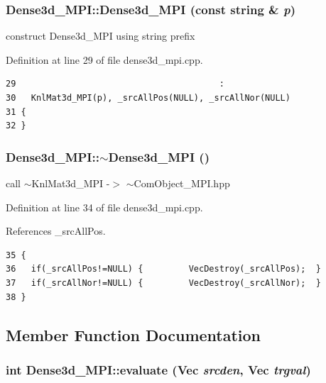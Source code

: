 \subsubsection{\setlength{\rightskip}{0pt plus 5cm}Dense3d\_\-MPI::Dense3d\_\-MPI (const string \& {\em p})}\label{classDense3d__MPI_59f5eb1835ca9679e901a3ed7e570e99_59f5eb1835ca9679e901a3ed7e570e99}


construct Dense3d\_\-MPI using string prefix 

Definition at line 29 of file dense3d\_\-mpi.cpp.

\footnotesize\begin{verbatim}29                                        : 
30   KnlMat3d_MPI(p), _srcAllPos(NULL), _srcAllNor(NULL)
31 {
32 }
\end{verbatim}\normalsize 


\subsubsection{\setlength{\rightskip}{0pt plus 5cm}Dense3d\_\-MPI::$\sim$Dense3d\_\-MPI ()}\label{classDense3d__MPI_465a68462d0c24f1003e280546467196_465a68462d0c24f1003e280546467196}


call $\sim$Knl\-Mat3d\_\-MPI -$>$ $\sim$Com\-Object\_\-MPI.hpp 

Definition at line 34 of file dense3d\_\-mpi.cpp.

References \_\-src\-All\-Pos.

\footnotesize\begin{verbatim}35 {
36   if(_srcAllPos!=NULL) {         VecDestroy(_srcAllPos);  }
37   if(_srcAllNor!=NULL) {         VecDestroy(_srcAllNor);  }
38 }
\end{verbatim}\normalsize 




\subsection{Member Function Documentation}
\subsubsection{\setlength{\rightskip}{0pt plus 5cm}int Dense3d\_\-MPI::evaluate (Vec {\em srcden}, Vec {\em trgval})\hspace{0.3cm}{\tt  [virtual]}}\label{classDense3d__MPI_b6d6d5d529463497e5bed037a921cfc2_b6d6d5d529463497e5bed037a921cfc2}


